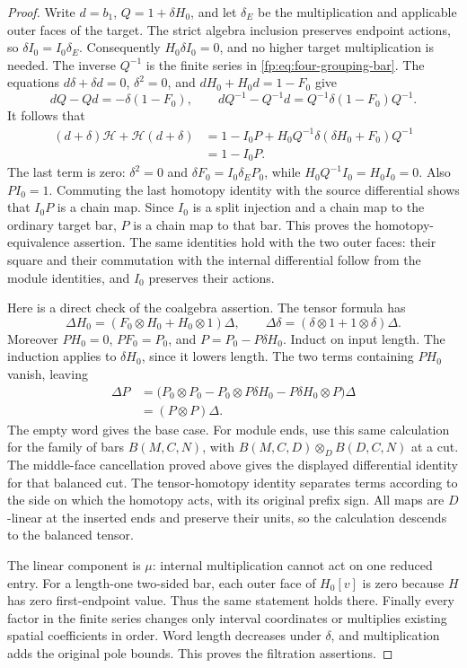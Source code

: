 \begin{proof}
Write \(d=b_1\), \(Q=1+\delta H_0\), and let \(\delta_E\)
be the multiplication and applicable outer faces of the target.
The strict algebra inclusion preserves endpoint actions, so
\(\delta I_0=I_0\delta_E\).  Consequently
\(H_0\delta I_0=0\), and no higher target multiplication is needed.
The inverse \(Q^{-1}\) is the finite series in
\eqref{fp:eq:four-grouping-bar}.  The equations
\(d\delta+\delta d=0\), \(\delta^2=0\), and
\(dH_0+H_0d=1-F_0\) give
\[
 dQ-Qd=-\delta(1-F_0),\qquad
 dQ^{-1}-Q^{-1}d=Q^{-1}\delta(1-F_0)Q^{-1}.
\]
It follows that
\[
 \begin{aligned}
 (d+\delta)\mathcal H+\mathcal H(d+\delta)
 &=1-I_0P+H_0Q^{-1}\delta(\delta H_0+F_0)Q^{-1}\\
 &=1-I_0P.
 \end{aligned}
\]
The last term is zero: \(\delta^2=0\) and
\(\delta F_0=I_0\delta_EP_0\), while
\(H_0Q^{-1}I_0=H_0I_0=0\).
Also \(PI_0=1\).  Commuting the last homotopy identity with
the source differential shows that \(I_0P\) is a chain map.
Since \(I_0\) is a split injection and a chain map to the
ordinary target bar, \(P\) is a chain map to that bar.
This proves the homotopy-equivalence assertion.
The same identities hold with the two outer faces: their square
and their commutation with the internal differential follow from
the module identities, and \(I_0\) preserves their actions.

Here is a direct check of the coalgebra assertion.  The tensor formula
has
\[
 \Delta H_0=(F_0\otimes H_0+H_0\otimes1)\Delta,
 \qquad \Delta\delta=(\delta\otimes1+1\otimes\delta)\Delta.
\]
Moreover \(PH_0=0\), \(PF_0=P_0\), and
\(P=P_0-P\delta H_0\).  Induct on input length.
The induction applies to \(\delta H_0\), since it lowers
length.  The two terms containing \(PH_0\) vanish, leaving
\[
 \begin{aligned}
 \Delta P
 &=\bigl(P_0\otimes P_0-P_0\otimes P\delta H_0
                  -P\delta H_0\otimes P\bigr)\Delta\\
 &=(P\otimes P)\Delta.
 \end{aligned}
\]
The empty word gives the base case.  For module ends, use this
same calculation for the family of bars \(B(M,C,N)\), with
\(B(M,C,D)\otimes_D B(D,C,N)\) at a cut.  The middle-face
cancellation proved above gives the displayed differential identity
for that balanced cut.  The tensor-homotopy identity separates terms
according to the side on which the homotopy acts, with its original prefix sign.
All maps are \(D\)-linear at the inserted ends and preserve
their units, so the calculation descends to the balanced tensor.

The linear component is \(\mu\): internal multiplication
cannot act on one reduced entry.  For a length-one two-sided
bar, each outer face of \(H_0[v]\) is zero because \(H\)
has zero first-endpoint value.  Thus the same statement holds there.
Finally every factor in the finite series changes only interval
coordinates or multiplies existing spatial coefficients in order.
Word length decreases under \(\delta\), and multiplication
adds the original pole bounds.  This proves the filtration assertions.
\end{proof}

